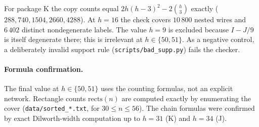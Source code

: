 For package K the copy counts equal $2h(h-3)^2 - 2\binom h3$ exactly ($288, 740, 1504, 2660, 4288$). At $h = 16$ the check covers $10\,800$ nested wires and $6\,402$ distinct nondegenerate labels. The value $h = 9$ is excluded because $I - J/9$ is itself degenerate there; this is irrelevant at $h\in\{50,51\}$. As a negative control, a deliberately invalid support rule (\texttt{scripts/bad\_supp.py}) fails the checker.

\paragraph{Formula confirmation.} The final value at $h \in\{50,51\}$ uses the counting formulas, not an explicit network. Rectangle counts $\mathrm{rects}(n)$ are computed exactly by enumerating the cover (\texttt{data/sorted\_*.txt}, for $30\le n\le 56$). The chain formulas were confirmed by exact Dilworth-width computation up to $h = 31$ (K) and $h = 34$ (J).

